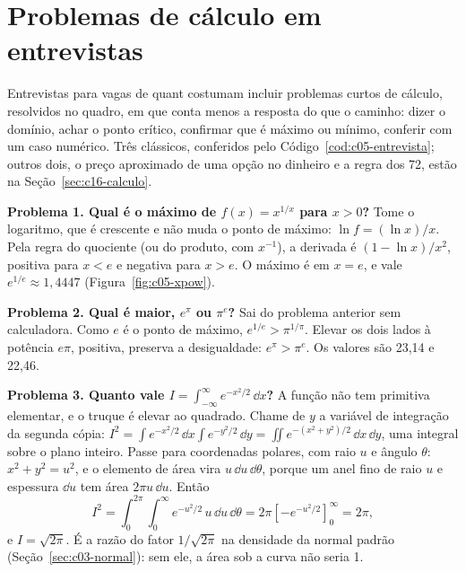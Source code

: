 
\section{Problemas de cálculo em entrevistas}
\label{sec:c05-entrevista}

Entrevistas para vagas de quant costumam incluir problemas curtos de cálculo, resolvidos no quadro, em que conta menos a resposta do que o caminho: dizer o domínio, achar o ponto crítico, confirmar que é máximo ou mínimo, conferir com um caso numérico. Três clássicos, conferidos pelo Código~\ref{cod:c05-entrevista}; outros dois, o preço aproximado de uma opção no dinheiro e a regra dos 72, estão na Seção~\ref{sec:c16-calculo}.


\textbf{Problema 1. Qual é o máximo de $f(x) = x^{1/x}$ para $x > 0$?} Tome o logaritmo, que é crescente e não muda o ponto de máximo: $\ln f = (\ln x)/x$. Pela regra do quociente (ou do produto, com $x^{-1}$), a derivada é $(1 - \ln x)/x^2$, positiva para $x < e$ e negativa para $x > e$. O máximo é em $x = e$, e vale $e^{1/e} \approx 1,4447$ (Figura~\ref{fig:c05-xpow}).

\textbf{Problema 2. Qual é maior, $e^{\pi}$ ou $\pi^{e}$?} Sai do problema anterior sem calculadora. Como $e$ é o ponto de máximo, $e^{1/e} > \pi^{1/\pi}$. Elevar os dois lados à potência $e\pi$, positiva, preserva a desigualdade: $e^{\pi} > \pi^{e}$. Os valores são 23,14 e 22,46.

\textbf{Problema 3. Quanto vale $I = \int_{-\infty}^{\infty} e^{-x^2/2}\,\dd x$?} A função não tem primitiva elementar, e o truque é elevar ao quadrado. Chame de $y$ a variável de integração da segunda cópia: $I^2 = \int e^{-x^2/2}\,\dd x \int e^{-y^2/2}\,\dd y = \iint e^{-(x^2 + y^2)/2}\,\dd x\,\dd y$, uma integral sobre o plano inteiro. Passe para coordenadas polares, com raio $u$ e ângulo $\theta$: $x^2 + y^2 = u^2$, e o elemento de área vira $u\,\dd u\,\dd\theta$, porque um anel fino de raio $u$ e espessura $\dd u$ tem área $2\pi u\,\dd u$. Então
\[
  I^2 = \int_0^{2\pi}\!\!\int_0^{\infty} e^{-u^2/2}\,u\,\dd u\,\dd\theta
      = 2\pi\left[-e^{-u^2/2}\right]_0^{\infty} = 2\pi ,
\]
e $I = \sqrt{2\pi}$. É a razão do fator $1/\sqrt{2\pi}$ na densidade da normal padrão (Seção~\ref{sec:c03-normal}): sem ele, a área sob a curva não seria 1.

